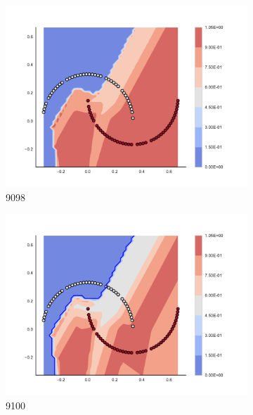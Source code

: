 \begin{figure}[h]
\begin{subfigure}[b]{0.09\textwidth}
    \includegraphics[clip, trim=2.35cm 1.75cm 4.5cm 0cm,width=\textwidth]{img/convergence/9098.pdf}
    \caption{9098}
    \label{fig:convergence_9098}
\end{subfigure}
%
\begin{subfigure}[b]{0.09\textwidth}
    \includegraphics[clip, trim=2.35cm 1.75cm 4.5cm 0cm,width=\textwidth]{img/convergence/9100.pdf}
    \caption{9100}
    \label{fig:convergence_9100}
\end{subfigure}
%
\begin{subfigure}[b]{0.09\textwidth}

\end{subfigure}
\end{figure}
